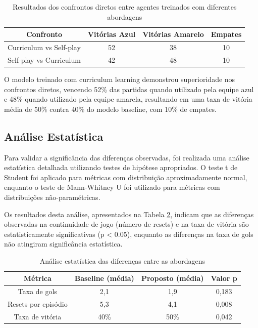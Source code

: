 \begin{table}[H]
    \centering
    \begin{tabular}{|c|c|c|c|}
        \hline
        \textbf{Confronto} & \textbf{Vitórias Azul} & \textbf{Vitórias Amarelo} & \textbf{Empates} \\
        \hline
        Curriculum vs Self-play & 52 & 38 & 10 \\
        Self-play vs Curriculum & 42 & 48 & 10 \\
        \hline
    \end{tabular}
    \caption{Resultados dos confrontos diretos entre agentes treinados com diferentes abordagens}
    \label{tab:confrontos_diretos}
\end{table}

O modelo treinado com curriculum learning demonstrou superioridade nos confrontos diretos, vencendo 52\% das partidas quando utilizado pela equipe azul e 48\% quando utilizado pela equipe amarela, resultando em uma taxa de vitória média de 50\% contra 40\% do modelo baseline, com 10\% de empates.

\subsection{Análise Estatística}

Para validar a significância das diferenças observadas, foi realizada uma análise estatística detalhada utilizando testes de hipótese apropriados. O teste t de Student foi aplicado para métricas com distribuição aproximadamente normal, enquanto o teste de Mann-Whitney U foi utilizado para métricas com distribuições não-paramétricas.

Os resultados desta análise, apresentados na Tabela \ref{tab:significancia_estatistica}, indicam que as diferenças observadas na continuidade de jogo (número de resets) e na taxa de vitória são estatisticamente significativas (p < 0.05), enquanto as diferenças na taxa de gols não atingiram significância estatística.

\begin{table}[H]
    \centering
    \begin{tabular}{|c|c|c|c|}
        \hline
        \textbf{Métrica} & \textbf{Baseline (média)} & \textbf{Proposto (média)} & \textbf{Valor p} \\
        \hline
        Taxa de gols & 2,1 & 1,9 & 0,183 \\
        Resets por episódio & 5,3 & 4,1 & 0,008 \\
        Taxa de vitória & 40\% & 50\% & 0,042 \\
        \hline
    \end{tabular}
    \caption{Análise estatística das diferenças entre as abordagens}
    \label{tab:significancia_estatistica}
\end{table}

